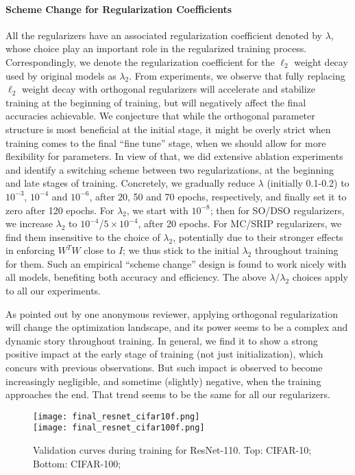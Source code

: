 \documentclass{article}
\newcounter{ass_counter}
\begin{document}
 \paragraph{Scheme Change for Regularization Coefficients}
All the regularizers have an associated regularization coefficient denoted by $\lambda$, whose choice play an important role in the regularized training process. Correspondingly, we denote the regularization coefficient for the $\ell_2$ weight decay used by original models as $\lambda_2$.
From experiments, we observe that fully replacing $\ell_2$ weight decay with orthogonal regularizers will accelerate and stabilize training at the beginning of training, but will negatively affect the final accuracies achievable. We conjecture that while the orthogonal parameter structure is most beneficial at the initial stage, it might be overly strict when training comes to the final ``fine tune'' stage, when we should allow for more flexibility for parameters. In view of that, we did extensive ablation experiments and identify a switching scheme between two regularizations, at the beginning and late stages of training. Concretely, we gradually reduce $\lambda$ (initially 0.1-0.2) to $10^{-3}$, $10^{-4}$ and $10^{-6}$, after 20, 50 and 70 epochs, respectively, and finally set it to zero after 120 epochs. For $\lambda_2$, we start with $10^{-8}$; then for SO/DSO regularizers, we increase $\lambda_2$ to $10^{-4}$/$5 \times 10^{-4}$, after 20 epochs. For MC/SRIP regularizers, we find them insensitive to the choice of $\lambda_2$, potentially due to their stronger effects in enforcing $W^TW$ close to $I$; we thus stick to the initial $\lambda_2$ throughout training for them. Such an empirical ``scheme change'' design is found to work nicely with all models, benefiting both accuracy and efficiency. The above $\lambda$/$\lambda_2$ choices apply to all our experiments.


As pointed out by one anonymous reviewer, applying orthogonal regularization will change the optimization landscape, and its power seems to be a complex and dynamic story throughout training. In general, we find it to show a strong positive impact at the early stage of training (not just initialization), which concurs with previous observations. But such impact is observed to become increasingly negligible, and sometime (slightly) negative, when the training approaches the end. That trend seems to be the same for all our regularizers.

 \begin{figure*}[ht]
    \begin{center}
        \texttt{[image: final\_resnet\_cifar10f.png]}
        \\
        \texttt{[image: final\_resnet\_cifar100f.png]}
    \end{center}
    \vspace{-1em}
    \caption{Validation curves during training for ResNet-110. Top: CIFAR-10; Bottom: CIFAR-100;}
        \vspace{-1em}
    \label{fig:resnet_validation1}
\end{figure*}
\end{document}
